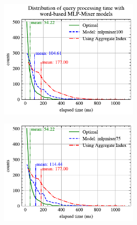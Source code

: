 \begin{figure}[!h]
	\centering
	\begin{subfigure}{0.45\textwidth}
		\begin{subfigure}{\textwidth}
			\centering
			\includegraphics[]{my/graphics/perf_dist_mlpmixer100_B.pdf}
		\end{subfigure}
		\vfill
		\begin{subfigure}{\textwidth}
			\centering
			\includegraphics[]{my/graphics/perf_dist_mlpmixer75_B.pdf}
		\end{subfigure}
		\vfill
		\begin{subfigure}{\textwidth}
			\centering

\end{subfigure}
\end{subfigure}
\end{figure}
